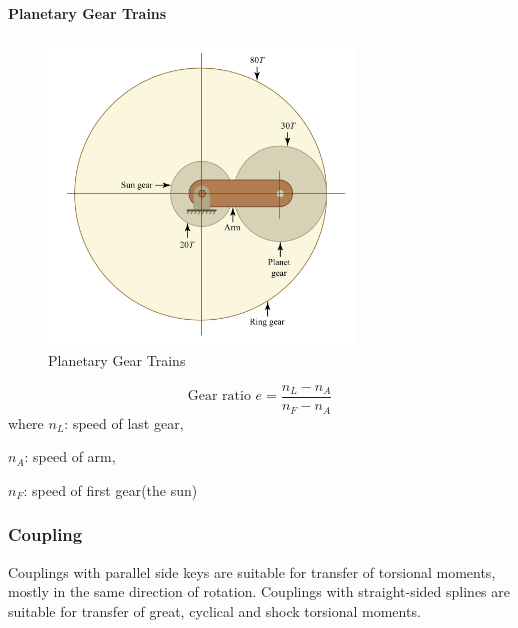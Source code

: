 \paragraph{Planetary Gear Trains}
\begin{figure}
  \centering
  \includegraphics[width=3.2in]{fig/fig_planetary.png}
  \caption{Planetary Gear Trains}\label{fig_planetary}
\end{figure}

$$\mbox{Gear ratio   } e=\frac{n_L-n_A}{n_F-n_A}$$
where $n_L$: speed of last gear,

$n_A$: speed of arm,

$n_F$: speed of first gear(the sun)

\subsubsection{Coupling}
Couplings with parallel side keys are suitable for transfer of torsional moments, mostly in the same direction of rotation. Couplings with straight-sided splines are suitable for transfer of great, cyclical and shock torsional moments.

